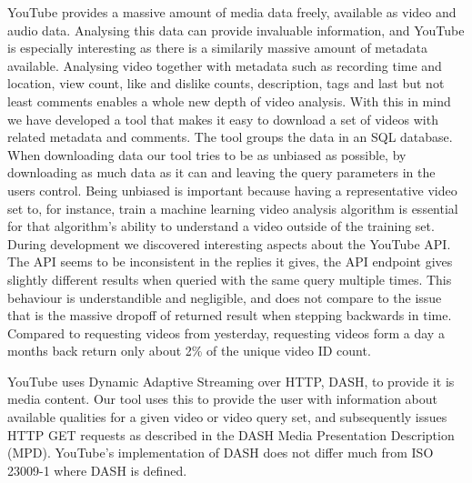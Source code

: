 YouTube provides a massive amount of media data freely, available as video and
audio data. Analysing this data can provide invaluable information, and YouTube
is especially interesting as there is a similarily massive amount of metadata
available. Analysing video together with metadata such as recording time and
location, view count, like and dislike counts, description, tags and last but
not least comments enables a whole new depth of video analysis. With this in 
mind we have developed a tool that makes it easy to download a set of videos
with related metadata and comments. The tool groups the data in an SQL database.
When downloading data our tool tries to be as unbiased as possible, by
downloading as much data as it can and leaving the query parameters in the users
control. Being unbiased is important because having a representative video set
to, for instance, train a machine learning video analysis algorithm is essential
for that algorithm's ability to understand a video outside of the training set.
During development we discovered interesting aspects about the YouTube API.
The API seems to be inconsistent in the replies it gives, the API endpoint gives
slightly different results when queried with the same query multiple times. This
behaviour is understandible and negligible, and does not compare to the issue
that is the massive dropoff of returned result when stepping backwards in time.
Compared to requesting videos from yesterday, requesting videos form a day a
months back return only about 2\% of the unique video ID count. 

YouTube uses Dynamic Adaptive Streaming over HTTP, DASH, to provide it is media
content. Our tool uses this to provide the user with information about available
qualities for a given video or video query set, and subsequently issues HTTP GET
requests as described in the DASH Media Presentation Description (MPD). 
YouTube's implementation of DASH does not differ much from ISO 23009-1 where 
DASH is defined.
